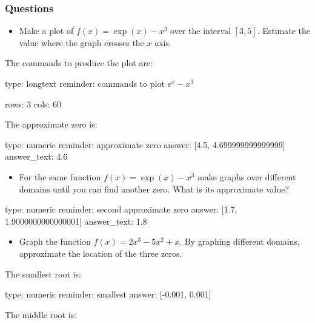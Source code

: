 \documentclass[12pt]{article}
\begin{document}
\subsubsection{Questions}

\begin{itemize}
\itemsep1pt\parskip0pt
\item
  Make a plot of $f(x) = \exp(x) - x^3$ over the interval $[3,5]$.
  Estimate the value where the graph crosses the $x$ axis.
\end{itemize}

The commands to produce the plot are:

\begin{answer}
type: longtext
reminder: commands to plot \( e^x - x^3 \)

rows: 3
cols: 60
\end{answer}

The approximate zero is:

\begin{answer}
    type: numeric
    reminder: approximate zero
    answer: [4.5, 4.699999999999999]
answer_text: 4.6 
\end{answer}

\begin{itemize}
\itemsep1pt\parskip0pt
\item
  For the same function $f(x) = \exp(x) - x^3$ make graphs over
  different domains until you can find another zero. What is its
  approximate value?
\end{itemize}

\begin{answer}
    type: numeric
    reminder: second approximate zero
    answer: [1.7, 1.9000000000000001]
answer_text: 1.8 
\end{answer}

\begin{itemize}
\itemsep1pt\parskip0pt
\item
  Graph the function $f(x) = 2x^3 - 5x^2 + x$. By graphing different
  domains, approximate the location of the three zeros.
\end{itemize}

The smallest root is:

\begin{answer}
    type: numeric
    reminder: smallest
    answer: [-0.001, 0.001]

\end{answer}

The middle root is:
\end{document}

